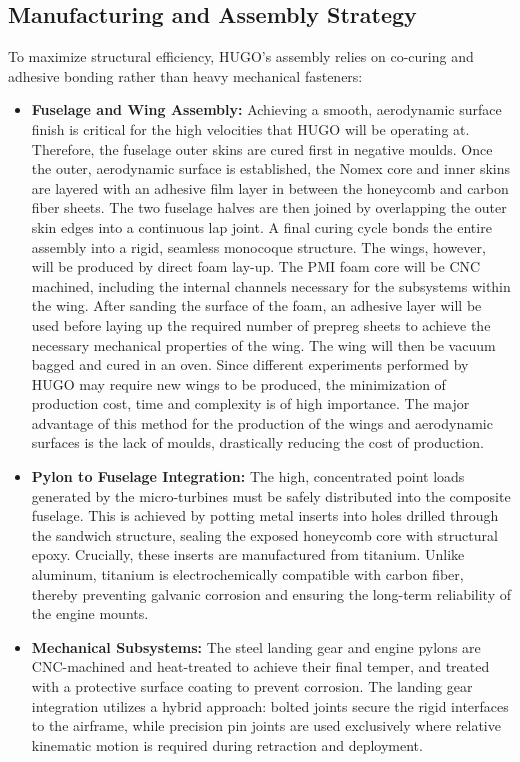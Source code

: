 \subsection*{Manufacturing and Assembly Strategy}
\label{subsec:exec-MAI}
To maximize structural efficiency, HUGO's assembly relies on co-curing and adhesive bonding rather than heavy mechanical fasteners:
\begin{itemize}
    \item \textbf{Fuselage and Wing Assembly:} Achieving a smooth, aerodynamic surface finish is critical for the high velocities that HUGO will be operating at. Therefore, the fuselage outer skins are cured first in negative moulds. Once the outer, aerodynamic surface is established, the Nomex core and inner skins are layered with an adhesive film layer in between the honeycomb and carbon fiber sheets. The two fuselage halves are then joined by overlapping the outer skin edges into a continuous lap joint. A final curing cycle bonds the entire assembly into a rigid, seamless monocoque structure. The wings, however, will be produced by direct foam lay-up. The PMI foam core will be CNC machined, including the internal channels necessary for the subsystems within the wing. After sanding the surface of the foam, an adhesive layer will be used before laying up the required number of prepreg sheets to achieve the necessary mechanical properties of the wing. The wing will then be vacuum bagged and cured in an oven. Since different experiments performed by HUGO may require new wings to be produced, the minimization of production cost, time and complexity is of high importance. The major advantage of this method for the production of the wings and aerodynamic surfaces is the lack of moulds, drastically reducing the cost of production.
    \item \textbf{Pylon to Fuselage Integration:} The high, concentrated point loads generated by the micro-turbines must be safely distributed into the composite fuselage. This is achieved by potting metal inserts into holes drilled through the sandwich structure, sealing the exposed honeycomb core with structural epoxy. Crucially, these inserts are manufactured from titanium. Unlike aluminum, titanium is electrochemically compatible with carbon fiber, thereby preventing galvanic corrosion and ensuring the long-term reliability of the engine mounts.
    \item \textbf{Mechanical Subsystems:} The steel landing gear and engine pylons are CNC-machined and heat-treated to achieve their final temper, and treated with a protective surface coating to prevent corrosion. The landing gear integration utilizes a hybrid approach: bolted joints secure the rigid interfaces to the airframe, while precision pin joints are used exclusively where relative kinematic motion is required during retraction and deployment.
\end{itemize}

